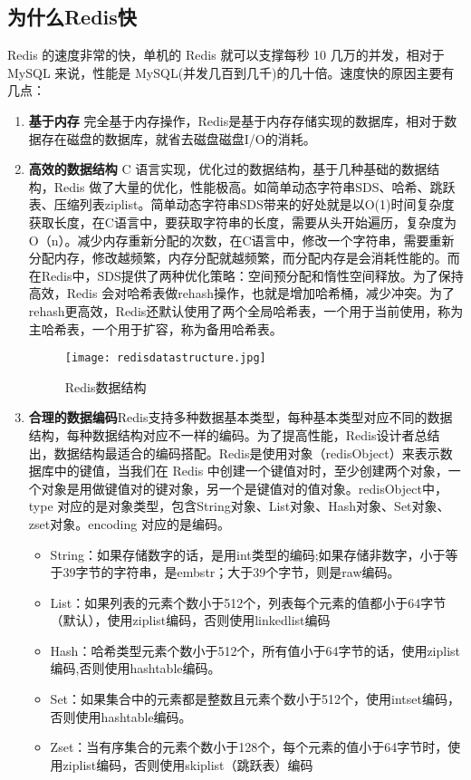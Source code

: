 \documentclass[../../../interview-questions.tex]{subfiles}
\begin{document}
\subsection{为什么Redis快}

Redis 的速度非常的快，单机的 Redis 就可以支撑每秒 10 几万的并发，相对于 MySQL 来说，性能是 MySQL(并发几百到几千)的几十倍。速度快的原因主要有几点：

\begin{enumerate}
    \item {\bf{基于内存}} 完全基于内存操作，Redis是基于内存存储实现的数据库，相对于数据存在磁盘的数据库，就省去磁盘磁盘I/O的消耗。
    \item {\bf{高效的数据结构}} C 语言实现，优化过的数据结构，基于几种基础的数据结构，Redis 做了大量的优化，性能极高。如简单动态字符串SDS、哈希、跳跃表、压缩列表ziplist。简单动态字符串SDS带来的好处就是以O(1)时间复杂度获取长度，在C语言中，要获取字符串的长度，需要从头开始遍历，复杂度为O（n）。减少内存重新分配的次数，在C语言中，修改一个字符串，需要重新分配内存，修改越频繁，内存分配就越频繁，而分配内存是会消耗性能的。而在Redis中，SDS提供了两种优化策略：空间预分配和惰性空间释放。为了保持高效，Redis 会对哈希表做rehash操作，也就是增加哈希桶，减少冲突。为了rehash更高效，Redis还默认使用了两个全局哈希表，一个用于当前使用，称为主哈希表，一个用于扩容，称为备用哈希表。

\begin{figure}[htbp]
    \centering
    \texttt{[image: redisdatastructure.jpg]}
    \caption{Redis数据结构}
    \label{fig:redisdatastructure}
\end{figure}

    \item {\bf{合理的数据编码}}Redis支持多种数据基本类型，每种基本类型对应不同的数据结构，每种数据结构对应不一样的编码。为了提高性能，Redis设计者总结出，数据结构最适合的编码搭配。Redis是使用对象（redisObject）来表示数据库中的键值，当我们在 Redis 中创建一个键值对时，至少创建两个对象，一个对象是用做键值对的键对象，另一个是键值对的值对象。redisObject中，type 对应的是对象类型，包含String对象、List对象、Hash对象、Set对象、zset对象。encoding 对应的是编码。

    \begin{itemize}
        \item {String：如果存储数字的话，是用int类型的编码;如果存储非数字，小于等于39字节的字符串，是embstr；大于39个字节，则是raw编码。}
        \item {List：如果列表的元素个数小于512个，列表每个元素的值都小于64字节（默认），使用ziplist编码，否则使用linkedlist编码}
        \item {Hash：哈希类型元素个数小于512个，所有值小于64字节的话，使用ziplist编码,否则使用hashtable编码。}
        \item {Set：如果集合中的元素都是整数且元素个数小于512个，使用intset编码，否则使用hashtable编码。}
        \item {Zset：当有序集合的元素个数小于128个，每个元素的值小于64字节时，使用ziplist编码，否则使用skiplist（跳跃表）编码}
    \end{itemize}
    

\end{enumerate}
\end{document}
